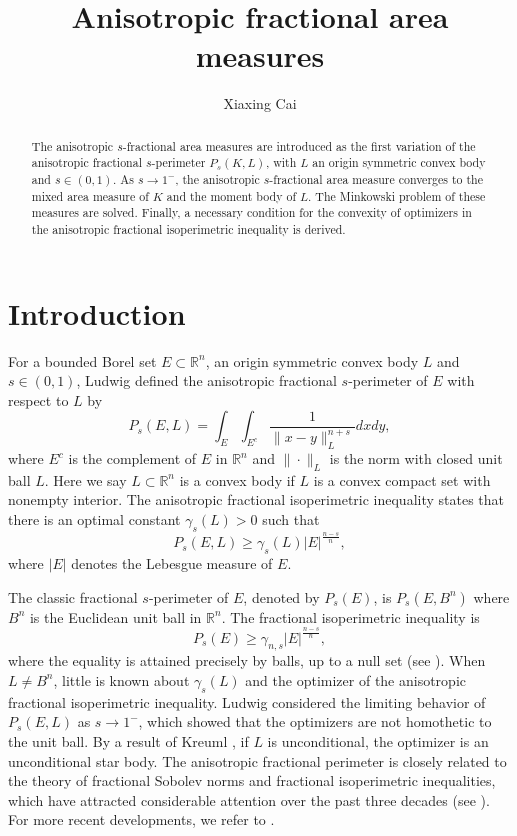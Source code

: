 \documentclass[12pt, oneside,reqno]{amsart}
\title[Anisotropic fractional area measures]{Anisotropic fractional area measures}
\author{Xiaxing Cai}
\numberwithin{equation}{section}
\newtheorem{definition and theorem}[theorem]{Definition and Theorem}
\theoremstyle{plain}
\theoremstyle{remark}
\theoremstyle{definition}
\newcommand{\rn}{\mathbb R^n}
\begin{document}
\date{}

\begin{abstract}
    The anisotropic $s$-fractional area measures are introduced as the first variation of the anisotropic fractional $s$-perimeter $P_s(K,L)$, with $L$ an origin symmetric convex body and $s\in(0,1)$. As $s\rightarrow 1^-$, the anisotropic  $s$-fractional area measure converges to the mixed area measure of $K$ and the moment body of $L$. The Minkowski problem of these measures are solved. Finally, a necessary condition for the convexity of optimizers in the anisotropic fractional isoperimetric inequality is derived.
\end{abstract}

\maketitle

\section{Introduction}


For a bounded Borel set $E\subset\rn$, an origin symmetric convex body $L$ and $s\in(0,1)$, Ludwig \cite{Lud1} defined the anisotropic fractional $s$-perimeter of $E$ with respect to $L$ by
\[P_s(E,L)=\int_{E}\int_{E^c}\frac{1}{\|x-y\|_L^{n+s}}dxdy,\]
where $E^c$ is the complement of $E$ in $\rn$ and $\|\cdot\|_L$ is the norm with closed unit ball $L$. Here we say $L\subset \rn$ is a convex body if $L$ is a convex compact set with nonempty interior. 
The anisotropic fractional isoperimetric inequality states that there is an optimal constant $\gamma_s(L)>0$ such that
\[P_s(E,L)\ge \gamma_s(L)|E|^{\frac{n-s}{n}},\]
where $|E|$ denotes the Lebesgue measure of $E$.

The classic fractional $s$-perimeter of $E$, denoted by $P_s(E)$, is $P_s(E,B^n)$ where $B^n$ is the Euclidean unit ball in $\rn$. The fractional isoperimetric inequality is
\[P_s(E)\ge \gamma_{n,s}|E|^{\frac{n-s}{n}},\]
where the equality is attained precisely by balls, up to a null set (see \cite{FS}). When $L\neq B^n$, little is known about $\gamma_s(L)$ and the optimizer of the anisotropic fractional isoperimetric inequality. Ludwig \cite{Lud1} considered the limiting behavior of $P_s(E,L)$ as $s\rightarrow 1^-$, which showed that the optimizers are not homothetic to the unit ball. By a result of Kreuml \cite{Kr}, if $L$ is unconditional, the optimizer is an unconditional star body. 
The anisotropic fractional perimeter is closely related to the theory of fractional Sobolev norms and fractional isoperimetric inequalities, which have attracted considerable attention over the past three decades (see \cite{CLYZ2, HS, Kr,  Lud1,Lud2, LYZ2, LYZ3, Wa, Zh}). For more recent developments, we refer to \cite{Cai, HL1, HL2, HL3}. 
\end{document}
